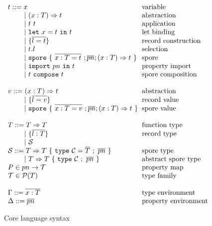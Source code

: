 \documentclass{llncs}
\newcommand{\seq}[1]{\overline{#1}}
\newcommand{\ba}{\begin{array}}
\newcommand{\ea}{\end{array}}
\newcommand{\gap}{\quad\quad}
\begin{document}
\begin{figure*}[ht!]
  \centering

  $\ba[t]{l@{\hspace{2mm}}l}
t ::=     x                                 & \mbox{variable}
\\
\gap ~|~  (x: T) \Rightarrow t              & \mbox{abstraction}
\\
\gap ~|~  t~t                               & \mbox{application}
\\
\gap ~|~  \texttt{let}~x = t~\texttt{in}~t  & \mbox{let binding}
\\
\gap ~|~  \{ \seq{l = t} \}                 & \mbox{record construction}
\\
\gap ~|~  t.l                               & \mbox{selection}
\\
\gap ~|~  \texttt{spore}~\{~\seq{x : T = t}~; \seq{pn} ; (x: T) \Rightarrow t~\}  & \mbox{spore}
\\
\gap ~|~  \texttt{import}~pn~\texttt{in}~t  & \mbox{property import}
\\
\gap ~|~  t~\texttt{compose}~t              & \mbox{spore composition}
\\
 & \\
v ::=     (x: T) \Rightarrow t              & \mbox{abstraction}
\\
\gap ~|~  \{ \seq{l = v} \}                 & \mbox{record value}
\\
\gap ~|~  \texttt{spore}~\{~\seq{x : T = v}~; \seq{pn} ; (x: T) \Rightarrow t~\}  & \mbox{spore value}
\\
 & \\
T ::=     T \Rightarrow T                   & \mbox{function type} \\
\gap ~|~  \{ \seq{l : T} \}                 & \mbox{record type}   \\
\gap ~|~  \mathcal{S}                       & \mbox{}
\\
\mathcal{S} ::= T \Rightarrow T~\{~\texttt{type}~\mathcal{C} = \seq{T}~;~\seq{pn}~\}   & \mbox{spore type}
\\
\gap ~|~  T \Rightarrow T~\{~\texttt{type}~\mathcal{C}~;~\seq{pn}~\}   & \mbox{abstract spore type}
\\
P \in pn \rightarrow \mathcal{T} & \mbox {property map}
\\
\mathcal{T} \in \mathcal{P}(T)   & \mbox{type family}
\\
 & \\
\Gamma ::=  \seq{x : T}          & \mbox{type environment}
\\
\Delta ::=  \seq{pn}             & \mbox{property environment}
\\
\ea$

  \caption{Core language syntax}
  \label{fig:syntax}
\end{figure*}
\end{document}
